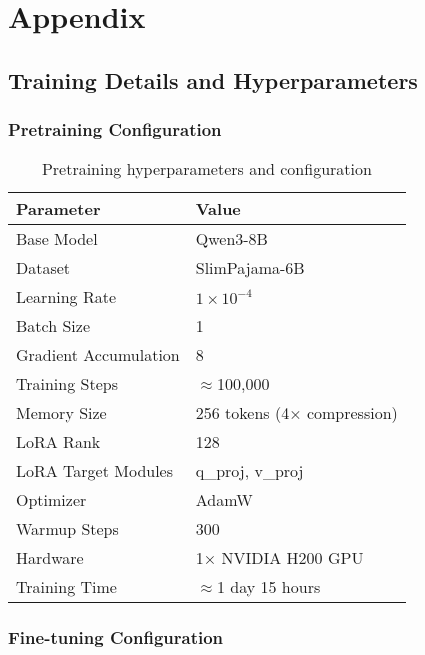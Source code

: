 \appendix
\chapter{Appendix}


\section{Training Details and Hyperparameters}
\label{app:training_details}

\subsection{Pretraining Configuration}

\begin{table}[h]
    \centering
    \small
    \begin{tabular}{ll}
        \toprule
        \textbf{Parameter} & \textbf{Value} \\
        \midrule
        Base Model & Qwen3-8B \\
        Dataset & SlimPajama-6B \\
        Learning Rate & $1 \times 10^{-4}$ \\
        Batch Size & 1 \\
        Gradient Accumulation & 8 \\
        Training Steps & $\approx$100,000 \\
        Memory Size & 256 tokens (4× compression) \\
        LoRA Rank & 128 \\
        LoRA Target Modules & q\_proj, v\_proj \\
        Optimizer & AdamW \\
        Warmup Steps & 300 \\
        Hardware & 1× NVIDIA H200 GPU \\
        Training Time & $\approx$1 day 15 hours \\
        \bottomrule
    \end{tabular}
    \caption{Pretraining hyperparameters and configuration}
    \label{tab:pretrain_config}
\end{table}

\subsection{Fine-tuning Configuration}

